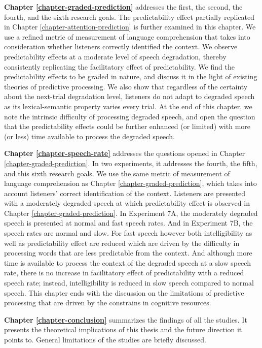 \documentclass[a4paper, nobind]{templates/ociamthesis}
\begin{document}
\noindent
\textbf{Chapter \ref{chapter-graded-prediction}} addresses the first, the second, the fourth, and the sixth research goals.
The predictability effect partially replicated in Chapter \ref{chapter-attention-prediction} is further examined in this chapter.
We use a refined metric of measurement of language comprehension that takes into consideration whether listeners correctly identified the context.
We observe predictability effects at a moderate level of speech degradation, thereby consistently replicating the facilitatory effect of predictability.
We find the predictability effects to be graded in nature,
and discuss it in the light of existing theories of predictive processing.
We also show that regardless of the certainty about the next-trial degradation level,
listeners do not adapt to degraded speech as its lexical-semantic property varies every trial.
At the end of this chapter, we note the intrinsic difficulty of processing degraded speech, and open the question that the predictability effects could be further enhanced (or limited) with more (or less) time available to process the degraded speech.

\noindent
\textbf{Chapter \ref{chapter-speech-rate}} addresses the questions opened in Chapter \ref{chapter-graded-prediction}.
In two experiments, it addresses the fourth, the fifth, and this sixth research goals.
We use the same metric of measurement of language comprehension as Chapter \ref{chapter-graded-prediction}, which takes into account listeners' correct identification of the context.
Listeners are presented with a moderately degraded speech at which predictability effect is observed in Chapter \ref{chapter-graded-prediction}.
In Experiment 7A, the moderately degraded speech is presented at normal and fast speech rates.
And in Experiment 7B, the speech rates are normal and slow.
For fast speech however both intelligibility as well as predictability effect are reduced which are driven by the difficulty in processing words that are less predictable from the context.
And although more time is available to process the context of the degraded speech at a slow speech rate,
there is no increase in facilitatory effect of predictability with a reduced speech rate;
instead, intelligibility is reduced in slow speech compared to normal speech.
This chapter ends with the discussion on the limitations of predictive processing that are driven by the constrains in cognitive resources.

\noindent
\textbf{Chapter \ref{chapter-conclusion}} summarizes the findings of all the studies.
It presents the theoretical implications of this thesis and the future direction it points to.
General limitations of the studies are briefly discussed.
\end{document}
